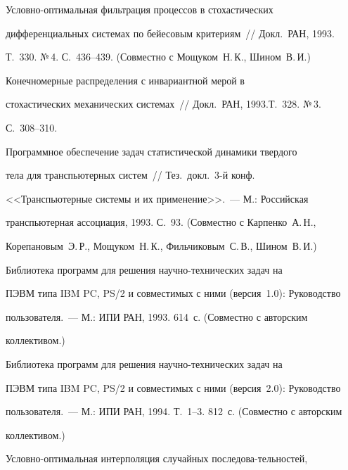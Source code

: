  Условно-оптимальная фильтрация процессов в стохастических


дифференциальных системах по бейесовым критериям~// Докл.\ РАН, 1993.


Т.~330. №\,4. С.~436--439. (Совместно с Мощуком~Н.\,К., Шином~В.\,И.)





 Конечномерные распределения с инвариантной мерой в


стохастических механических системах~// Докл.\ РАН, 1993.\linebreak Т.~328. №\,3.


С.~308--310.





 Программное обеспечение задач статистической динамики твердого


тела для транспьютерных систем~// Тез.\ докл.\ 3-й конф.\


<<Транспьютерные системы и их применение>>.~--- М.: Российская


транспьютерная ассоциация, 1993. С.~93. (Совместно с Карпенко~А.\,Н.,


Корепановым~Э.\,Р., Мощуком~Н.\,К., Фильчиковым~С.\,В., Шином~В.\,И.)





 Библиотека программ для решения научно-технических задач на


ПЭВМ типа IBM PC, PS/2 и совместимых с ними (версия~1.0): Руководство


пользователя.~--- М.: ИПИ РАН, 1993. 614~с. (Совместно с авторским


коллективом.)










 Библиотека программ для решения научно-технических задач на


ПЭВМ типа IBM PC, PS/2 и совместимых с ними (версия~2.0): Руководство


пользователя.~--- М.: ИПИ РАН, 1994. Т.~1--3. 812~с. (Совместно с авторским


коллективом.)





 Условно-оптимальная интерполяция случайных последова-\linebreak тельностей,


